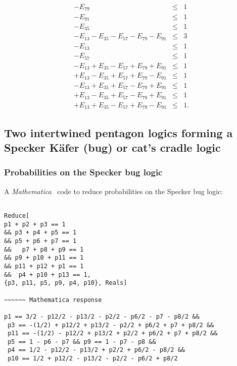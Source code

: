 \documentclass[%
  twocolumn,
 showpacs,
 showkeys,
 preprintnumbers,
 amsmath,amssymb,
 aps,
  pra,
  longbibliography,
 floatfix,
 ]{revtex4-1}
\begin{document}
\begin{eqnarray}
                                 - E_{79}             &\le& 1       \\
                                           - E_{91}   &\le& 1       \\
             - E_{35}                                 &\le& 1       \\
   - E_{13}  - E_{35}  - E_{57}  - E_{79}  - E_{91}   &\le& 3       \\
   - E_{13}                                           &\le& 1       \\
                       - E_{57}                       &\le& 1       \\
   - E_{13}  + E_{35}  - E_{57}  + E_{79}  + E_{91}   &\le& 1       \\
   + E_{13}  - E_{35}  + E_{57}  + E_{79}  - E_{91}   &\le& 1       \\
   - E_{13}  + E_{35}  + E_{57}  - E_{79}  + E_{91}   &\le& 1       \\
   + E_{13}  - E_{35}  + E_{57}  - E_{79}  + E_{91}   &\le& 1       \\
   + E_{13}  + E_{35}  - E_{57}  + E_{79}  - E_{91}   &\le& 1
.
\label{2017-b-kl-e-i}
\end{eqnarray}

\subsection{Two intertwined pentagon logics forming a Specker K\"afer (bug) or cat's cradle logic}

\subsubsection{Probabilities on the Specker bug logic}

A {\em Mathematica}~\cite{Mathematica11.1} code to reduce probabilities on the Specker bug logic:


{ \begin{lstlisting}[backgroundcolor=\color{yellow!10},framerule=0pt,breaklines=true, frame=tb]

Reduce[
p1 + p2 + p3 == 1
&& p3 + p4 + p5 == 1
&& p5 + p6 + p7 == 1
&&   p7 + p8 + p9 == 1
&& p9 + p10 + p11 == 1
&& p11 + p12 + p1 == 1
&&  p4 + p10 + p13 == 1,
{p3, p11, p5, p9, p4, p10}, Reals]

~~~~~~ Mathematica response

p1 == 3/2 - p12/2 - p13/2 - p2/2 - p6/2 - p7 - p8/2 &&
 p3 == -(1/2) + p12/2 + p13/2 - p2/2 + p6/2 + p7 + p8/2 &&
 p11 == -(1/2) - p12/2 + p13/2 + p2/2 + p6/2 + p7 + p8/2 &&
 p5 == 1 - p6 - p7 && p9 == 1 - p7 - p8 &&
 p4 == 1/2 - p12/2 - p13/2 + p2/2 + p6/2 - p8/2 &&
 p10 == 1/2 + p12/2 - p13/2 - p2/2 - p6/2 + p8/2

\end{lstlisting}  }
\end{document}
